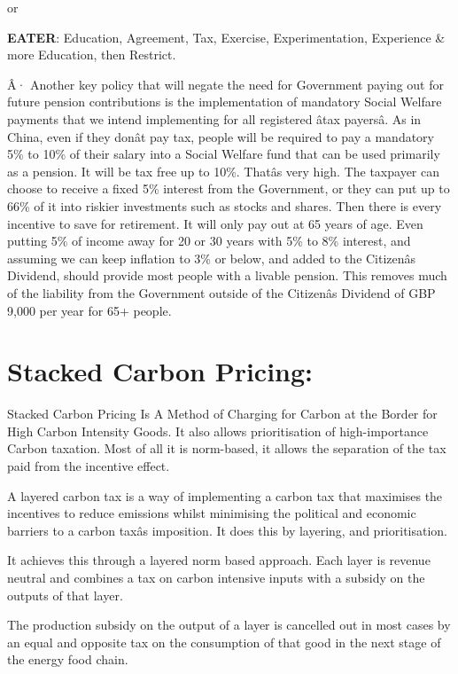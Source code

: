 \documentclass[]{tufte-handout}
\begin{document}
or

\textbf{EATER}: Education, Agreement, Tax, Exercise, Experimentation,
Experience \& more Education, then Restrict.

Â· Another key policy that will negate the need for Government paying
out for future pension contributions is the implementation of mandatory
Social Welfare payments that we intend implementing for all registered
âtax payersâ. As in China, even if they donât pay tax, people will
be required to pay a mandatory 5\% to 10\% of their salary into a Social
Welfare fund that can be used primarily as a pension. It will be tax
free up to 10\%. Thatâs very high. The taxpayer can choose to receive
a fixed 5\% interest from the Government, or they can put up to 66\% of
it into riskier investments such as stocks and shares. Then there is
every incentive to save for retirement. It will only pay out at 65 years
of age. Even putting 5\% of income away for 20 or 30 years with 5\% to
8\% interest, and assuming we can keep inflation to 3\% or below, and
added to the Citizenâs Dividend, should provide most people with a
livable pension. This removes much of the liability from the Government
outside of the Citizenâs Dividend of GBP 9,000 per year for 65+
people. \newpage

\hypertarget{stacked-carbon-pricing}{%
\section{Stacked Carbon Pricing:}\label{stacked-carbon-pricing}}

Stacked Carbon Pricing Is A Method of Charging for Carbon at the Border
for High Carbon Intensity Goods. It also allows prioritisation of
high-importance Carbon taxation. Most of all it is norm-based, it allows
the separation of the tax paid from the incentive effect.

A layered carbon tax is a way of implementing a carbon tax that
maximises the incentives to reduce emissions whilst minimising the
political and economic barriers to a carbon taxâs imposition. It does
this by layering, and prioritisation.

It achieves this through a layered norm based approach. Each layer is
revenue neutral and combines a tax on carbon intensive inputs with a
subsidy on the outputs of that layer.

The production subsidy on the output of a layer is cancelled out in most
cases by an equal and opposite tax on the consumption of that good in
the next stage of the energy food chain.
\end{document}
